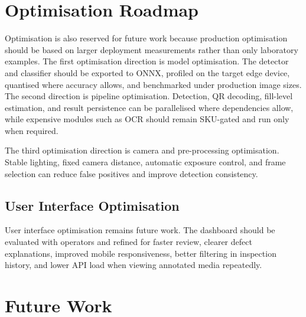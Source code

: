 \documentclass[12pt,a4paper]{report}
\begin{document}
\section{Optimisation Roadmap}
\label{sec:future-optimisation}

Optimisation is also reserved for future work because production optimisation should be based on larger deployment measurements rather than only laboratory examples. The first optimisation direction is model optimisation. The detector and classifier should be exported to ONNX, profiled on the target edge device, quantised where accuracy allows, and benchmarked under production image sizes. The second direction is pipeline optimisation. Detection, QR decoding, fill-level estimation, and result persistence can be parallelised where dependencies allow, while expensive modules such as OCR should remain SKU-gated and run only when required.

The third optimisation direction is camera and pre-processing optimisation. Stable lighting, fixed camera distance, automatic exposure control, and frame selection can reduce false positives and improve detection consistency.

\subsection{User Interface Optimisation}
\label{subsec:future-ui-optimisation}

User interface optimisation remains future work. The dashboard should be evaluated with operators and refined for faster review, clearer defect explanations, improved mobile responsiveness, better filtering in inspection history, and lower API load when viewing annotated media repeatedly.

\section{Future Work}
\label{sec:future-work}
\end{document}
